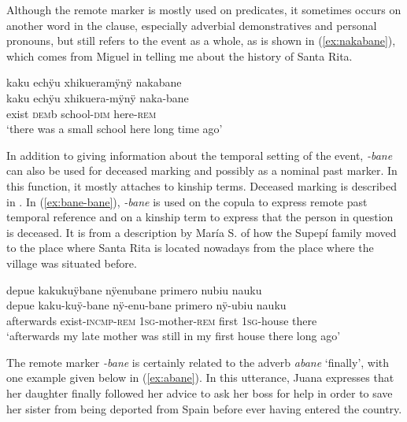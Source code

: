Although the remote marker is mostly used on predicates, it sometimes occurs on another word in the clause, especially adverbial demonstratives and personal pronouns, but still refers to the event as a whole, as is shown in (\ref{ex:nakabane}), which comes from Miguel in telling me about the history of Santa Rita.

\ea\label{ex:nakabane}
\begingl 
\glpreamble kaku echÿu xhikueramÿnÿ nakabane\\
\gla kaku echÿu xhikuera-mÿnÿ naka-bane\\ 
\glb exist \textsc{dem}b school-\textsc{dim} here-\textsc{rem}\\ 
\glft ‘there was a small school here long time ago’\\ 
\endgl
\trailingcitation{[mxx-p110825l.084]}
\xe

In addition to giving information about the temporal setting of the event, \textit{-bane} can also be used for deceased marking and possibly as a nominal past marker. In this function, it mostly attaches to kinship terms. Deceased marking is described in . In (\ref{ex:bane-bane}), \textit{-bane} is used on the copula to express remote past temporal reference and on a kinship term to express that the person in question is deceased. It is from a description by María S. of how the Supepí family moved to the place where Santa Rita is located nowadays from the place where the village was situated before. %

\ea\label{ex:bane-bane}
\begingl 
\glpreamble depue kakukuÿbane nÿenubane primero nubiu nauku\\
\gla depue kaku-kuÿ-bane nÿ-enu-bane primero nÿ-ubiu nauku\\ 
\glb afterwards exist-\textsc{incmp}-\textsc{rem} 1\textsc{sg}-mother-\textsc{rem} first 1\textsc{sg}-house there\\ 
\glft ‘afterwards my late mother was still in my first house there long ago’\\ 
\endgl
\trailingcitation{[rxx-e120511l.172]}%
\xe

The remote marker \textit{-bane} is certainly related to the adverb \textit{abane} ‘finally’, with one example given below in (\ref{ex:abane}). In this utterance, Juana expresses that her daughter finally followed her advice to ask her boss for help in order to save her sister from being deported from Spain before ever having entered the country.

